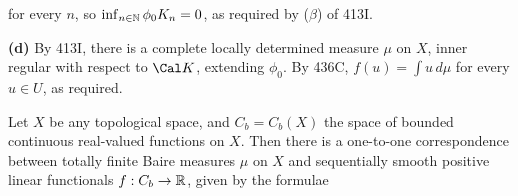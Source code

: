 { 
      
\noindent for every $n$, so $\inf_{n\in\Bbb N}\phi_0K_n=0$, as required 
by ($\beta$) of 413I.\ \Qed 
      
\medskip 
      
{\bf (d)} By 413I, there is a complete locally determined measure $\mu$ 
on $X$, inner regular with respect to $\Cal K$, extending $\phi_0$. 
By 436C, $f(u)=\int u\,d\mu$ for every $u\in U$, as required. 
}%
      
 Let $X$ be any topological space, 
and $C_b=C_b(X)$ the space of bounded continuous 
real-valued functions on 
$X$.   Then there is a one-to-one correspondence between totally finite 
Baire measures $\mu$ on $X$ and sequentially smooth positive linear 
functionals $f:C_b\to\Bbb R$, given by the formulae 
      
      
      
